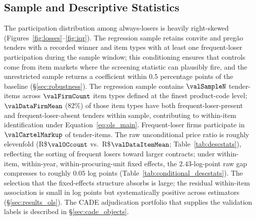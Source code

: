 


\subsection{Sample and Descriptive Statistics}
\label{sec:data_sample}

The participation distribution among always-losers is heavily
right-skewed (Figures~\ref{fig:losses}--\ref{fig:iqr}). The
regression sample retains convite and preg\~ao tenders with a
recorded winner and item types with at least one frequent-loser
participation during the sample window; this conditioning ensures
that controls come from item markets where the screening
statistic can plausibly fire, and the unrestricted sample returns
a coefficient within $0.5$ percentage points of the baseline
(\S\ref{sec:robustness}). The regression sample contains
$\valSampleN$ tender-items across $\valFirmCount$ item types
defined at the finest product-code level; $\valDataFirmMean$
($82\%$) of those item types have both
frequent-loser-present and frequent-loser-absent tenders within
sample, contributing to within-item identification under
Equation~\eqref{eq:ols_main}. Frequent-loser firms participate
in $\valCartelMarkup$ of tender-items. The raw unconditional
price ratio is roughly elevenfold
(R\$$\valOCcount$ vs.\ R\$$\valDataItemMean$;
Table~\ref{tab:descstats}), reflecting the sorting of frequent
losers toward larger contracts; under within-item, within-year,
within-procuring-unit fixed effects, the $2.43$-log-point raw
gap compresses to roughly $0.05$ log points
(Table~\ref{tab:conditional_descstats}). The selection that the
fixed-effects structure absorbs is large; the residual
within-item association is small in log points but systematically
positive across estimators (\S\ref{sec:results_ols}). The CADE
adjudication portfolio that supplies the validation labels is
described in \S\ref{sec:cade_objects}.


